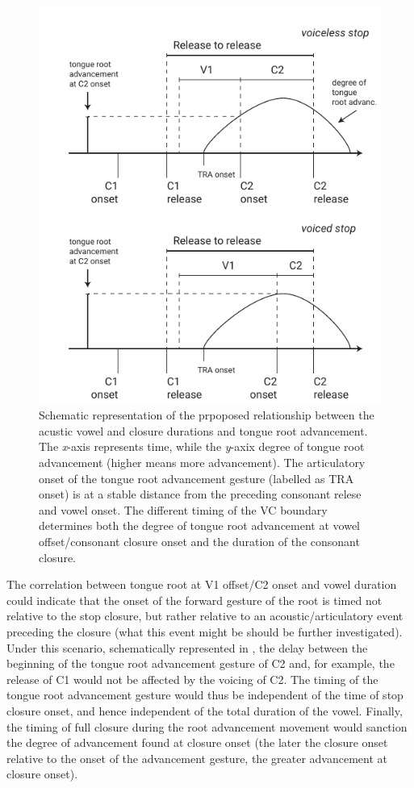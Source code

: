 \documentclass[preprint]{JASAnew}
\begin{document}
\begin{figure}
  \centering
  \includegraphics[width=.6\textwidth]{./Figure7.pdf}
  \caption{Schematic representation of the prpoposed relationship between the acustic vowel and closure durations and tongue root advancement. The \textit{x}-axis represents time, while the \textit{y}-axix degree of tongue root advancement (higher means more advancement). The articulatory onset of the tongue root advancement gesture (labelled as TRA onset) is at a stable distance from the preceding consonant relese and vowel onset. The different timing of the VC boundary determines both the degree of tongue root advancement at vowel offset/consonant closure onset and the duration of the consonant closure.}
  \label{f:Figure7}
\end{figure}

The correlation between tongue root at V1 offset/C2 onset and vowel
duration could indicate that the onset of the forward gesture of the
root is timed not relative to the stop closure, but rather relative to
an acoustic/articulatory event preceding the closure (what this event
might be should be further investigated). Under this scenario,
schematically represented in , the delay between the
beginning of the tongue root advancement gesture of C2 and, for example,
the release of C1 would not be affected by the voicing of C2. The timing
of the tongue root advancement gesture would thus be independent of the
time of stop closure onset, and hence independent of the total duration
of the vowel. Finally, the timing of full closure during the root
advancement movement would sanction the degree of advancement found at
closure onset (the later the closure onset relative to the onset of the
advancement gesture, the greater advancement at closure onset).
\end{document}
